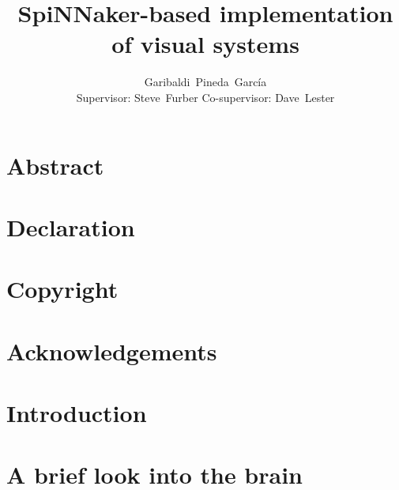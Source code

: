 \documentclass[11pt,a4paper,oneside]{memoir}
\title{SpiNNaker-based implementation of visual systems}
\author{Garibaldi~Pineda~García \\ Supervisor: Steve~Furber Co-supervisor: Dave~Lester}
\date{}
\begin{document}
  \thispagestyle{empty}
  

  \cleardoublepage
    \thispagestyle{empty}
  \tableofcontents
  \listoffigures
  \listoftables


\chapter*{Abstract}
\label{abstract}


\chapter*{Declaration}
\label{declaration}


\chapter*{Copyright}
\label{copyright}


\chapter*{Acknowledgements}
\label{acknowledgements}


\newpage\null\thispagestyle{empty}\newpage
{}
\pagestyle{ruled}

  \chapter{Introduction}
  \label{chp:intro}
  

\newpage\null\thispagestyle{empty}\newpage

  \chapter{A brief look into the brain}
  \label{chp:brain}
  
\end{document}
